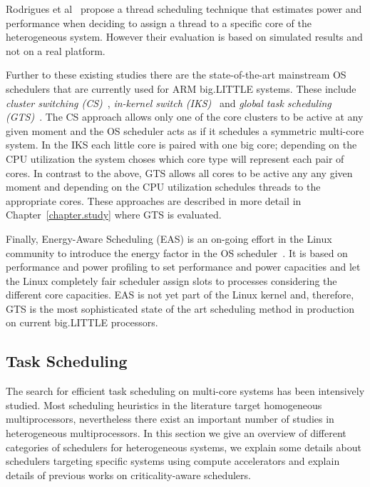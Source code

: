 Rodrigues et al~\cite{Rodrigues_thread_scheduling} propose a thread scheduling technique that estimates power and performance when deciding to assign a thread to a specific core of the heterogeneous system. 
However their evaluation is based on simulated results and not on a real platform. %

Further to these existing studies there are the state-of-the-art mainstream OS schedulers that are currently used for ARM big.LITTLE systems.
These include \textit{cluster switching (CS)}~\cite{samsung}, 
\textit{in-kernel switch (IKS)}~\cite{IKS} and \textit{global task scheduling (GTS)}~\cite{samsung}.
The CS approach allows only one of the core clusters to be active at any given moment and the OS scheduler acts as if it schedules a symmetric multi-core system.
In the IKS each little core is paired with one big core; depending on the CPU utilization the system choses which core type will represent each pair of cores.
In contrast to the above, GTS allows all cores to be active any any given moment and depending on the CPU utilization schedules threads to the appropriate cores.
These approaches are described in more detail in Chapter~\ref{chapter.study} where GTS is evaluated.

Finally, Energy-Aware Scheduling (EAS) is an on-going effort in the Linux community to introduce the energy factor in the OS scheduler~\cite{EAS, EAS_Linux}. 
It is based on performance and power profiling to set performance and power capacities and let the Linux completely fair scheduler assign slots to processes considering the different core capacities. 
EAS is not yet part of the Linux kernel and, therefore, GTS is the most sophisticated state of the art scheduling method in production on current big.LITTLE processors.


\subsection{Task Scheduling}

The search for efficient task scheduling on multi-core systems has been intensively studied. 
Most scheduling heuristics in the literature target homogeneous multiprocessors, nevertheless there exist an important number of studies in heterogeneous multiprocessors. 
In this section we give an overview of different categories of schedulers for heterogeneous systems, we explain some details about schedulers targeting specific systems using compute accelerators and explain details of previous works on criticality-aware schedulers.


